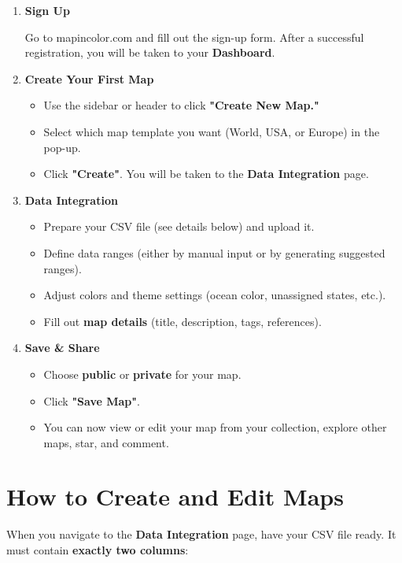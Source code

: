 \documentclass{article}
\begin{document}
\begin{enumerate}
  \item \textbf{Sign Up}

  Go to mapincolor.com and fill out the sign-up form. After a successful 
  registration, you will be taken to your \textbf{Dashboard}.

  \item \textbf{Create Your First Map}
  \begin{itemize}
    \item Use the sidebar or header to click \textbf{"Create New Map."}
    \item Select which map template you want (World, USA, or Europe) in the pop-up.
    \item Click \textbf{"Create"}. You will be taken to the 
          \textbf{Data Integration} page.
  \end{itemize}

  \item \textbf{Data Integration}
  \begin{itemize}
    \item Prepare your CSV file (see details below) and upload it.
    \item Define data ranges (either by manual input or by generating suggested ranges).
    \item Adjust colors and theme settings (ocean color, unassigned states, etc.).
    \item Fill out \textbf{map details} (title, description, tags, references).
  \end{itemize}

  \item \textbf{Save \& Share}
  \begin{itemize}
    \item Choose \textbf{public} or \textbf{private} for your map.
    \item Click \textbf{"Save Map"}.
    \item You can now view or edit your map from your collection, explore other 
          maps, star, and comment.
  \end{itemize}
\end{enumerate}

\section{How to Create and Edit Maps}

When you navigate to the \textbf{Data Integration} page, have your CSV file ready. 
It must contain \textbf{exactly two columns}:
\end{document}
